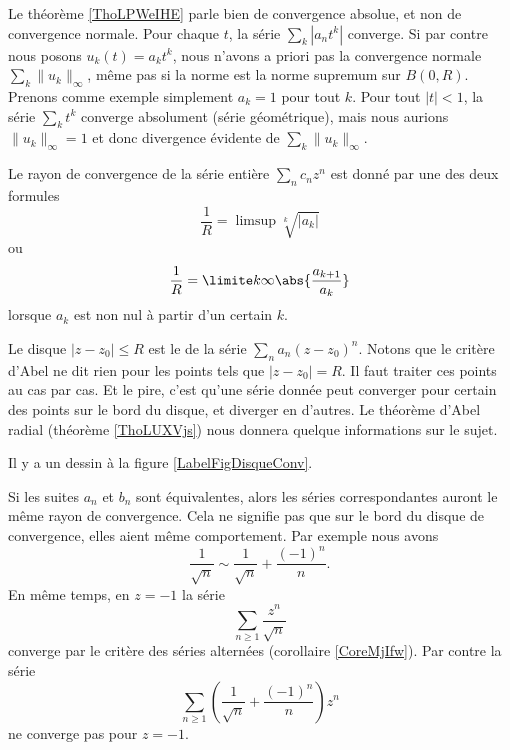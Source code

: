 Le théorème \ref{ThoLPWeIHE} parle bien de convergence absolue, et non de convergence normale. Pour chaque \( t\), la série \( \sum_k | a_nt^k |\) converge. Si par contre nous posons \( u_k(t)=a_kt^k\), nous n'avons a priori pas la convergence normale \( \sum_k\| u_k \|_{\infty}\), même pas si la norme est la norme supremum sur \( B(0,R)\). Prenons comme exemple simplement \( a_k=1\) pour tout \( k\). Pour tout \( | t |<1\), la série \( \sum_k t^k\) converge absolument (série géométrique), mais nous aurions \( \| u_k \|_{\infty}=1\) et donc divergence évidente de \( \sum_k\| u_k \|_{\infty}\).

\begin{theorem}		\label{ThoSerPuissRap}
Le rayon de convergence de la série entière \( \sum_n c_n z^n\) est donné par une des deux formules
\begin{equation}		\label{EqRayCOnvSer}
	\frac{1}{ R } =\limsup\sqrt[k]{| a_k |}
\end{equation}
ou
\begin{equation}		\label{EqAlphaSerPuissAtern}
	\frac{1}{ R }=\limite k \infty \abs{\frac{a_{k+1}}{a_k}}
\end{equation}
lorsque $a_k$ est non nul à partir d'un certain $k$.
\end{theorem}

Le disque $| z-z_0 |\leq R$ est le  de la série \( \sum_n a_n(z-z_0)^n\). Notons que le critère d'Abel ne dit rien pour les points tels que $| z-z_0 |=R$. Il faut traiter ces points au cas par cas. Et le pire, c'est qu'une série donnée peut converger pour certain des points sur le bord du disque, et diverger en d'autres. Le théorème d'Abel radial (théorème \ref{ThoLUXVjs}) nous donnera quelque informations sur le sujet.

Il y a un dessin à la figure \ref{LabelFigDisqueConv}.
\newcommand{\CaptionFigDisqueConv}{À l'intérieur du disque de convergence, la convergence est absolue. En dehors, la série diverge. Sur le cercle proprement dit, tout peut arriver.}


Si les suites \( a_n\) et \( b_n\) sont équivalentes, alors les séries correspondantes auront le même rayon de convergence. Cela ne signifie pas que sur le bord du disque de convergence, elles aient même comportement. Par exemple nous avons
\begin{equation}
    \frac{1}{ \sqrt{n} }\sim \frac{1}{ \sqrt{n} }+\frac{ (-1)^n }{ n }.
\end{equation}
En même temps, en \( z=-1\) la série 
\begin{equation}
    \sum_{n\geq 1}\frac{ z^n }{ \sqrt{n} }
\end{equation}
converge par le critère des séries alternées (corollaire \ref{CoreMjIfw}). Par contre la série
\begin{equation}
    \sum_{n\geq 1}\left( \frac{1}{ \sqrt{n} }+\frac{ (-1)^n }{ n } \right)z^n
\end{equation}
ne converge pas pour \( z=-1\).

